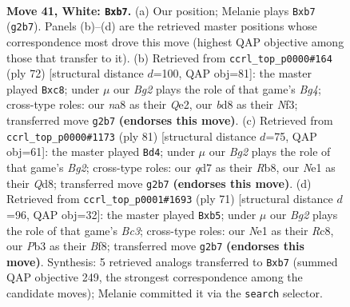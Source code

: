 \documentclass[11pt]{article}
\begin{document}
\clearpage

\begin{figure}[p]\centering
\begin{subfigure}{0.46\textwidth}\centering
\resizebox{\linewidth}{!}{%
\newchessgame
\chessboard[
  setfen={n1rb2k1/1b1q2n1/p4r2/P1p2p1p/3p1Pp1/1P4P1/2RBP1BP/RQ1NN1K1 w - - 0 41},
  showmover=false,
  pgfstyle=straightmove, color=movearrow, markmove={g2-b7}
]}
\caption{}
\end{subfigure}\hfill
\begin{subfigure}{0.46\textwidth}\centering
\resizebox{\linewidth}{!}{%
\newchessgame
\chessboard[
  setfen={2br2k1/p3q2p/1pnr1bpP/2p1p3/P1P1P1B1/3PBNP1/3RQ1K1/R7 w - - 1 37},
  showmover=false,
  pgfstyle=straightmove, color=movearrow, markmove={g4-c8}
]}
\caption{}
\end{subfigure}
\\[4pt]
\begin{subfigure}{0.46\textwidth}\centering
\resizebox{\linewidth}{!}{%
\newchessgame
\chessboard[
  setfen={1r1qr1k1/1b1n1pb1/pp1p2pp/2pP4/P3PPP1/2NB1RBP/1P1Q4/4R2K b - - 15 41},
  showmover=false,
  pgfstyle=straightmove, color=movearrow, markmove={g7-d4}
]}
\caption{}
\end{subfigure}\hfill
\begin{subfigure}{0.46\textwidth}\centering
\resizebox{\linewidth}{!}{%
\newchessgame
\chessboard[
  setfen={2rr1bk1/q4pp1/1pb1p2p/pB6/PnPPN3/4RPBP/4Q1P1/3R3K b - - 12 36},
  showmover=false,
  pgfstyle=straightmove, color=movearrow, markmove={c6-b5}
]}
\caption{}
\end{subfigure}
\caption{\textbf{Move 41, White: \texttt{Bxb7}.} (a) Our position; Melanie plays \texttt{Bxb7} (\texttt{g2b7}). Panels (b)--(d) are the retrieved master positions whose correspondence most drove this move (highest QAP objective among those that transfer to it). (b) Retrieved from \texttt{ccrl\_top\_p0000\#164} (ply 72) [structural distance $d$=100, QAP obj=81]: the master played \texttt{Bxc8}; under $\mu$ our \emph{Bg2} plays the role of that game's \emph{Bg4}; cross-type roles: our \emph{n}a8 as their \emph{Q}e2, our \emph{b}d8 as their \emph{N}f3; transferred move \texttt{g2b7} \textbf{(endorses this move)}. (c) Retrieved from \texttt{ccrl\_top\_p0000\#1173} (ply 81) [structural distance $d$=75, QAP obj=61]: the master played \texttt{Bd4}; under $\mu$ our \emph{Bg2} plays the role of that game's \emph{Bg2}; cross-type roles: our \emph{q}d7 as their \emph{R}b8, our \emph{N}e1 as their \emph{Q}d8; transferred move \texttt{g2b7} \textbf{(endorses this move)}. (d) Retrieved from \texttt{ccrl\_top\_p0001\#1693} (ply 71) [structural distance $d$=96, QAP obj=32]: the master played \texttt{Bxb5}; under $\mu$ our \emph{Bg2} plays the role of that game's \emph{Bc3}; cross-type roles: our \emph{N}e1 as their \emph{R}c8, our \emph{P}b3 as their \emph{B}f8; transferred move \texttt{g2b7} \textbf{(endorses this move)}. Synthesis: 5 retrieved analogs transferred to \texttt{Bxb7} (summed QAP objective 249, the strongest correspondence among the candidate moves); Melanie committed it via the \texttt{search} selector.}
\label{fig:thought-m80}
\end{figure}
\end{document}
